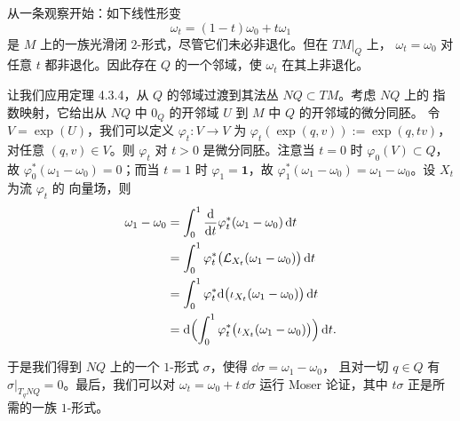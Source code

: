 \begin{wproof}[引理 4.3.1 的证明]
  从一条观察开始：如下线性形变
  \begin{equation*}
    \omega_t=(1-t)\omega_0+t\omega_1
  \end{equation*}
  是 $M$ 上的一族光滑闭 $2$-形式，尽管它们未必非退化。但在 $TM|_Q$ 上，
  $\omega_t=\omega_0$ 对任意 $t$ 都非退化。因此存在 $Q$ 的一个邻域，使 $\omega_t$
  在其上非退化。

  让我们应用定理 4.3.4，从 $Q$ 的邻域过渡到其法丛 $NQ\subset TM$。考虑 $NQ$ 上的
  指数映射，它给出从 $NQ$ 中 $0_Q$ 的开邻域 $U$ 到 $M$ 中 $Q$ 的开邻域的微分同胚。
  令 $V=\exp(U)$，我们可以定义 $\varphi_t\colon V\to V$ 为
  $\varphi_t(\exp(q,v)):=\exp(q,tv)$，对任意 $(q,v)\in V$。则 $\varphi_t$ 对
  $t>0$ 是微分同胚。注意当 $t=0$ 时 $\varphi_0(V)\subset Q$，故
  $\varphi_0^*(\omega_1-\omega_0)=0$；而当 $t=1$ 时 $\varphi_1=\mathbf 1$，故
  $\varphi_1^*(\omega_1-\omega_0)=\omega_1-\omega_0$。设 $X_t$ 为流 $\varphi_t$ 的
  向量场，则
  \begin{equation*}
    \begin{aligned}
      \omega_1-\omega_0
      &=\int_0^1\frac{\mathrm{d}}{\mathrm{d} t}\varphi_t^*(\omega_1-\omega_0)\,\mathrm{d} t\\
      &=\int_0^1\varphi_t^*\bigl(\mathcal L_{X_t}(\omega_1-\omega_0)\bigr)\,\mathrm{d} t\\
      &=\int_0^1\varphi_t^*\mathrm{d}\bigl(\iota_{X_t}(\omega_1-\omega_0)\bigr)\,\mathrm{d} t\\
      &=\mathrm{d}\Bigl(\int_0^1\varphi_t^*\bigl(\iota_{X_t}(\omega_1-\omega_0)\bigr)\Bigr)
      \,\mathrm{d} t.
    \end{aligned}
  \end{equation*}

  于是我们得到 $NQ$ 上的一个 $1$-形式 $\sigma$，使得 $\dd\sigma=\omega_1-\omega_0$，
  且对一切 $q\in Q$ 有 $\sigma|_{T_qNQ}=0$。最后，我们可以对
  $\omega_t=\omega_0+t\,\dd\sigma$ 运行 Moser 论证，其中 $t\sigma$ 正是所需的一族
  $1$-形式。
\end{wproof}
